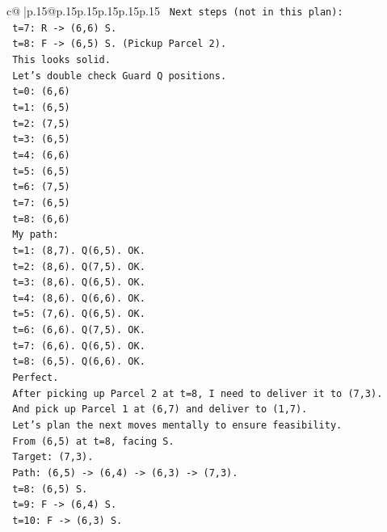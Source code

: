 \documentclass{article}
\begin{document}
{\begin{supertabular}{c@{$\;$}|p{.15\linewidth}@{}p{.15\linewidth}p{.15\linewidth}p{.15\linewidth}p{.15\linewidth}p{.15\linewidth}}
{{{\texttt{     Next steps (not in this plan):} \\
\texttt{     t=7: R {-}> (6,6) S.} \\
\texttt{     t=8: F {-}> (6,5) S. (Pickup Parcel 2).} \\
\texttt{     This looks solid.} \\
\texttt{     Let's double check Guard Q positions.} \\
\texttt{     t=0: (6,6)} \\
\texttt{     t=1: (6,5)} \\
\texttt{     t=2: (7,5)} \\
\texttt{     t=3: (6,5)} \\
\texttt{     t=4: (6,6)} \\
\texttt{     t=5: (6,5)} \\
\texttt{     t=6: (7,5)} \\
\texttt{     t=7: (6,5)} \\
\texttt{     t=8: (6,6)} \\
\texttt{     My path:} \\
\texttt{     t=1: (8,7). Q(6,5). OK.} \\
\texttt{     t=2: (8,6). Q(7,5). OK.} \\
\texttt{     t=3: (8,6). Q(6,5). OK.} \\
\texttt{     t=4: (8,6). Q(6,6). OK.} \\
\texttt{     t=5: (7,6). Q(6,5). OK.} \\
\texttt{     t=6: (6,6). Q(7,5). OK.} \\
\texttt{     t=7: (6,6). Q(6,5). OK.} \\
\texttt{     t=8: (6,5). Q(6,6). OK.} \\
\texttt{     Perfect.} \\
\texttt{     After picking up Parcel 2 at t=8, I need to deliver it to (7,3).} \\
\texttt{     And pick up Parcel 1 at (6,7) and deliver to (1,7).} \\
\texttt{     Let's plan the next moves mentally to ensure feasibility.} \\
\texttt{     From (6,5) at t=8, facing S.} \\
\texttt{     Target: (7,3).} \\
\texttt{     Path: (6,5) {-}> (6,4) {-}> (6,3) {-}> (7,3).} \\
\texttt{     t=8: (6,5) S.} \\
\texttt{     t=9: F {-}> (6,4) S.} \\
\texttt{     t=10: F {-}> (6,3) S.} \\
}}}
\end{supertabular}}
\end{document}
